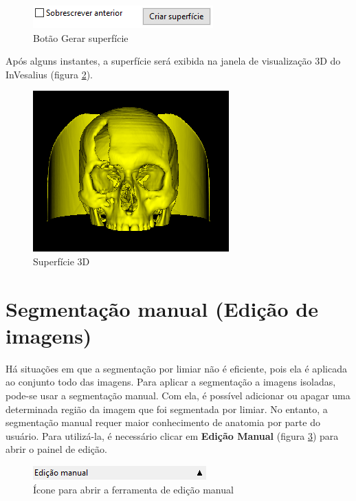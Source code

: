 \begin{figure}[!htb]
\centering
\includegraphics[scale=0.55]{../user_guide_figures/invesalius_screen/segmentation_generate_surface_pt.png}
\caption{Botão Gerar superfície}
\label{fig:generate_surface}
\end{figure}

Após alguns instantes, a superfície será exibida na janela de visualização 3D do InVesalius
(figura \ref{fig:surface}).

\begin{figure}[!htb]
\centering
\includegraphics[scale=0.5]{../user_guide_figures/invesalius_screen/surface_from_threshold.png}
\caption{Superfície 3D}
\label{fig:surface}
\end{figure}
 


\section{Segmentação manual (Edição de imagens)}

Há situações em que a segmentação por limiar não é eficiente, pois ela é aplicada ao conjunto
todo das imagens. Para aplicar a segmentação a imagens isoladas, pode-se usar a segmentação
manual. Com ela, é possível adicionar ou apagar uma determinada região da imagem que foi
segmentada por limiar. No entanto, a segmentação manual requer maior conhecimento de anatomia
por parte do usuário. Para utilizá-la, é necessário clicar em \textbf{Edição Manual} (figura \ref{fig:advanced_edition}) para abrir o painel de edição.

\begin{figure}[!htb]
\centering
\includegraphics[scale=0.75]{../user_guide_figures/invesalius_screen/segmentation_manual_label_pt.png}
\caption{Ícone para abrir a ferramenta de edição manual}
\label{fig:advanced_edition}
\end{figure}

